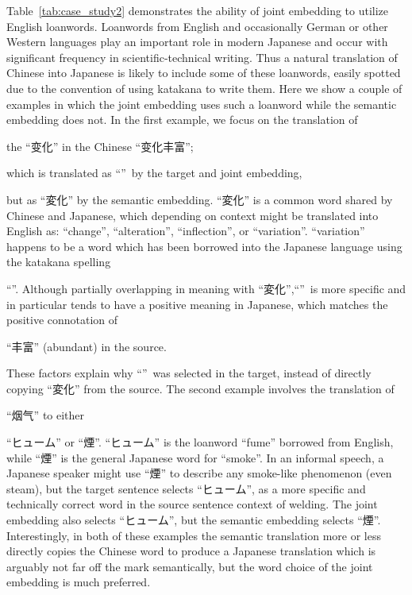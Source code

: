 \begin{CJK}{UTF8}{ipxm}
    Table~\ref{tab:case_study2} demonstrates the ability of joint embedding to utilize English loanwords. Loanwords from English and occasionally German or other Western languages play an important role in modern Japanese and occur with significant frequency in scientific-technical writing. Thus a natural translation of Chinese into Japanese is likely to include some of these loanwords, easily spotted due to the convention of using katakana to write them. Here we show a couple of examples in which the joint embedding uses such a loanword while the semantic embedding does not. In the first example, we focus on the translation of \end{CJK}\begin{CJK}{UTF8}{gbsn}the ``变化'' in the Chinese \mbox{``变化丰富''};\end{CJK}\begin{CJK}{UTF8}{ipxm} which is translated as ``\variation''\ by the target and joint embedding,
    \end{CJK}\begin{CJK}{UTF8}{ipxm} but as ``変化'' by the semantic embedding. ``変化'' is a common word shared by Chinese and Japanese, which depending on context might be translated into English as: ``change'', ``alteration'', ``inflection'', or ``variation''. ``variation'' happens to be a word which has been borrowed into the Japanese language using the katakana spelling \end{CJK}\begin{CJK}{UTF8}{ipxm}``\variation''. Although partially overlapping in meaning with ``変化'',\enspace``\variation''\ is more specific and in particular tends to have a positive meaning in Japanese, which matches the positive connotation of \end{CJK}\begin{CJK}{UTF8}{gbsn}``丰富'' (abundant) in the source. \end{CJK}\begin{CJK}{UTF8}{ipxm}These factors explain why ``\variation''\ was selected in the target, instead of directly copying ``変化'' from the source. The second example involves the translation of
    \end{CJK}\begin{CJK}{UTF8}{gbsn}``烟气'' to either
    \end{CJK}\begin{CJK}{UTF8}{ipxm}``ヒューム'' or ``煙''. ``ヒューム'' is the loanword ``fume'' borrowed from English, while ``煙'' is the general Japanese word for ``smoke''. In an informal speech, a Japanese speaker might use ``煙'' to describe any smoke-like phenomenon (even steam), but the target sentence selects ``ヒューム'', as a more specific and technically correct word in the source sentence context of welding. The joint embedding also selects ``ヒューム'', but the semantic embedding selects ``煙''. Interestingly, in both of these examples the semantic translation more or less directly copies the Chinese word to produce a Japanese translation which is arguably not far off the mark semantically, but the word choice of the joint embedding is much preferred.
\end{CJK}

